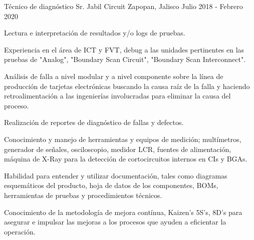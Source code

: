 


\begin{cventries}


\cventry
{Técnico de diagnóstico Sr.} %
{Jabil Circuit} %
{Zapopan, Jalisco} %
{Julio 2018 - Febrero 2020} %
{ %
\begin{cvitems}
\item {Lectura e interpretación de resultados y/o logs de pruebas.}
\item {Experiencia en el área de ICT y FVT, debug a las unidades pertinentes en las pruebas de "Analog", "Boundary Scan Circuit", "Boundary Scan Interconnect".}
\item {Análisis de falla a nivel modular y a nivel componente sobre la línea de producción de tarjetas electrónicas buscando la causa raíz de la falla y haciendo retroalimentación a las ingenierías involucradas para eliminar la causa del proceso.}
\item{Realización de reportes de diagnóstico de fallas y defectos.}
\item{Conocimiento y manejo de herramientas y equipos de medición; multímetros, generador de señales, osciloscopio, medidor LCR, fuentes de alimentación, máquina de X-Ray para la detección de cortocircuitos internos en CIs y BGAs.}
\item{Habilidad para entender y utilizar documentación, tales como diagramas esquemáticos del producto, hoja de datos de los componentes, BOMs, herramientas de pruebas y procedimientos técnicos.}
\item{Conocimiento de la metodología de mejora contínua, Kaizen's 5S's, 8D's para asegurar e impulsar las mejoras a los procesos que ayuden a eficientar la operación.}
\end{cvitems}
}



\end{cventries}
